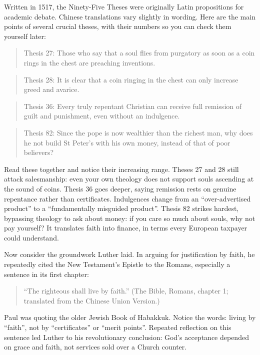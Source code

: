 Written in 1517, the Ninety-Five Theses were originally Latin propositions for academic debate. Chinese translations vary slightly in wording. Here are the main points of several crucial theses, with their numbers so you can check them yourself later:

\begin{quote}
Thesis 27: Those who say that a soul flies from purgatory as soon as a coin rings in the chest are preaching inventions.
\end{quote}
\begin{quote}
Thesis 28: It is clear that a coin ringing in the chest can only increase greed and avarice.
\end{quote}
\begin{quote}
Thesis 36: Every truly repentant Christian can receive full remission of guilt and punishment, even without an indulgence.
\end{quote}
\begin{quote}
Thesis 82: Since the pope is now wealthier than the richest man, why does he not build St Peter's with his own money, instead of that of poor believers?
\end{quote}
Read these together and notice their increasing range. Theses 27 and 28 still attack salesmanship: even your own theology does not support souls ascending at the sound of coins. Thesis 36 goes deeper, saying remission rests on genuine repentance rather than certificates. Indulgences change from an ``over-advertised product'' to a ``fundamentally misguided product''. Thesis 82 strikes hardest, bypassing theology to ask about money: if you care so much about souls, why not pay yourself? It translates faith into finance, in terms every European taxpayer could understand.

Now consider the groundwork Luther laid. In arguing for justification by faith, he repeatedly cited the New Testament's Epistle to the Romans, especially a sentence in its first chapter:

\begin{quote}
``The righteous shall live by faith.'' (The Bible, Romans, chapter 1; translated from the Chinese Union Version.)
\end{quote}
Paul was quoting the older Jewish Book of Habakkuk. Notice the words: living by ``faith'', not by ``certificates'' or ``merit points''. Repeated reflection on this sentence led Luther to his revolutionary conclusion: God's acceptance depended on grace and faith, not services sold over a Church counter.

